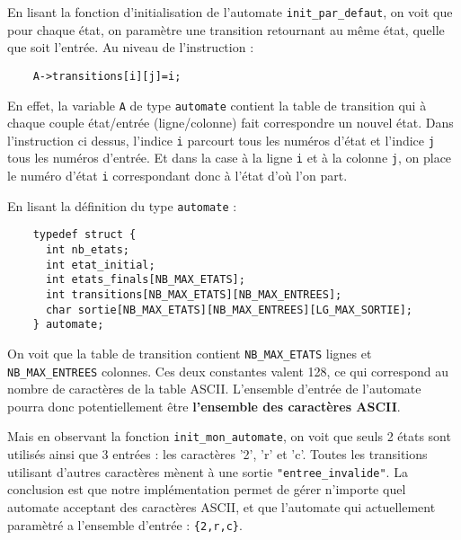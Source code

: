 \documentclass[10pt]{article}
\begin{document}
\begin{enumerate}[label=\textbf{[\alph*]}]
  \setlength\itemsep{1em}

\item En lisant la fonction d'initialisation de l'automate
  \texttt{init\_par\_defaut}, on voit que pour chaque état, on
  paramètre une transition retournant au même état, quelle que soit
  l'entrée. Au niveau de l'instruction :

  \lstset{style=customc}
  \begin{lstlisting}
    A->transitions[i][j]=i;
  \end{lstlisting}

  En effet, la variable \texttt{A} de type \texttt{automate} contient
  la table de transition qui à chaque couple état/entrée
  (ligne/colonne) fait correspondre un nouvel état. Dans l'instruction
  ci dessus, l'indice \texttt{i} parcourt tous les numéros d'état et
  l'indice \texttt{j} tous les numéros d'entrée. Et dans la case à la
  ligne \texttt{i} et à la colonne \texttt{j}, on place le numéro
  d'état \texttt{i} correspondant donc à l'état d'où l'on part.

\item En lisant la définition du type \texttt{automate} :

  \lstset{style=customc}
  \begin{lstlisting}
    typedef struct {
      int nb_etats;
      int etat_initial;
      int etats_finals[NB_MAX_ETATS];
      int transitions[NB_MAX_ETATS][NB_MAX_ENTREES];
      char sortie[NB_MAX_ETATS][NB_MAX_ENTREES][LG_MAX_SORTIE];
    } automate;
  \end{lstlisting}

  On voit que la table de transition contient \texttt{NB\_MAX\_ETATS}
  lignes et \texttt{NB\_MAX\_ENTREES} colonnes. Ces deux constantes
  valent 128, ce qui correspond au nombre de caractères de la table
  ASCII. L'ensemble d'entrée de l'automate pourra donc potentiellement
  être \textbf{l'ensemble des caractères ASCII}.
  \vspace{0.2cm}

  Mais en observant la fonction \texttt{init\_mon\_automate}, on voit
  que seuls 2 états sont utilisés ainsi que 3 entrées : les caractères
  '2', 'r' et 'c'. Toutes les transitions utilisant d'autres
  caractères mènent à une sortie \texttt{"entree\_invalide"}. La
  conclusion est que notre implémentation permet de gérer n'importe
  quel automate acceptant des caractères ASCII, et que l'automate qui
  actuellement paramètré a l'ensemble d'entrée : \texttt{\{2,r,c\}}.
  \vspace{0.2cm}


\end{enumerate}
\end{document}
